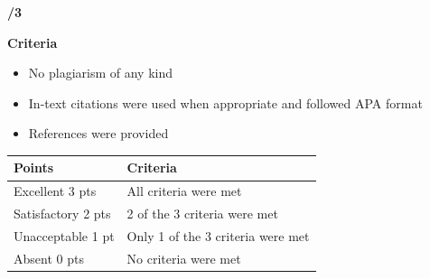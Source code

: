\documentclass[
]{book}
\providecommand{\tightlist}{%
  \setlength{\itemsep}{0pt}\setlength{\parskip}{0pt}}
\begin{document}
\textbf{/3}

\textbf{Criteria}

\begin{itemize}
\tightlist
\item
  No plagiarism of any kind
\item
  In-text citations were used when appropriate and followed APA format
\item
  References were provided
\end{itemize}

\begin{longtable}[]{@{}ll@{}}
\toprule()
Points & Criteria \\
\midrule()
\endhead
Excellent 3 pts & All criteria were met \\
Satisfactory 2 pts & 2 of the 3 criteria were met \\
Unacceptable 1 pt & Only 1 of the 3 criteria were met \\
Absent 0 pts & No criteria were met \\
\bottomrule()
\end{longtable}
\end{document}
